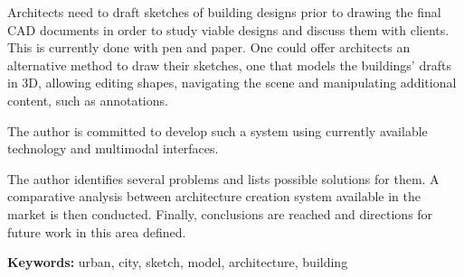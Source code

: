 Architects need to draft sketches of building designs prior to drawing
the final CAD documents in order to study viable designs and discuss them with clients.
This is currently done with pen and paper. One could offer architects an alternative
method to draw their sketches, one that models the buildings' drafts in 3D, allowing
editing shapes, navigating the scene and manipulating additional content,
such as annotations.

The author is committed to develop such a system using currently available technology
and multimodal interfaces.

The author identifies several problems and lists possible solutions for them.
A comparative analysis between architecture creation system available in the market
is then conducted.
Finally, conclusions are reached and directions for future work in this area defined.

\textbf{Keywords:} urban, city, sketch, model, architecture, building

